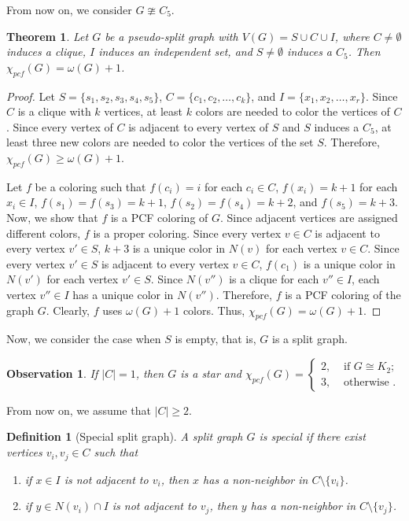 \documentclass[11pt]{article}
\theoremstyle{plain}
\newtheorem{theorem}{Theorem}
\newtheorem{defi}{Definition}
\newtheorem{obs}{Observation}
\begin{document}
From now on, we consider $G\ncong C_5$.

\begin{theorem}\label{Sneqemptyset}
	Let $G$ be a pseudo-split graph with $V(G) = S \cup C \cup I$, where $C\neq\emptyset$ induces a clique, $I$ induces an independent set, and $S\neq\emptyset$ induces a $C_5$. Then $\chi_{pcf}(G) = \omega(G)+1$.
\end{theorem}
\begin{proof}
	Let $S = \{s_1, s_2, s_3, s_4, s_5\}$, $C = \{c_1, c_2, \ldots, c_k\}$, and $I = \{x_1, x_2, \ldots, x_r\}$. Since $C$ is a clique with $k$ vertices, at least $k$ colors are needed to color the vertices of $C$. Since every vertex of $C$ is adjacent to every vertex of $S$ and $S$ induces a $C_5$, at least three new colors are needed to color the vertices of the set $S$. %
	Therefore, $\chi_{pcf}(G)\geq\omega(G)+1$.
	
	\medskip
	
	Let $f$ be a coloring such that $f(c_i) = i$ for each $c_i \in C$, $f(x_i) = k+1$ for each $x_i\in I$, $f(s_1) = f(s_3)=k+1$, $f(s_2) = f(s_4)=k+2$, and $f(s_5) = k+3$. 
	Now, we show that $f$ is a PCF coloring of $G$. Since adjacent vertices are assigned different colors, $f$ is a proper coloring. Since every vertex $v\in C$ is adjacent to every vertex $v'\in S$, $k+3$ is a unique color in $N(v)$ for each vertex $v\in C$. Since every vertex $v'\in S$ is adjacent to every vertex $v\in C$, $f(c_1)$ is a unique color in $N(v')$ for each vertex $v'\in S$. Since $N(v'')$ is a clique for each $v''\in I$, each vertex $v''\in I$ has a unique color in $N(v'')$. Therefore, $f$ is a PCF coloring of the graph $G$. Clearly, $f$ uses $\omega(G)+1$ colors.
	Thus, $\chi_{pcf}(G)=\omega(G)+1$.
\end{proof}

Now, we consider the case when $S$ is empty, that is, $G$ is a split graph. 

\begin{obs}
	If $|C|=1$, then $G$ is a star and $\chi_{pcf}(G) = \begin{cases} 
		2, & \text{ if } G\cong K_2; \\
		3, & \text{ otherwise }.
	\end{cases}$
\end{obs}

From now on, we assume that $|C|\geq 2$.
\begin{defi}[\textsf{Special split graph}]\label{special_split}
	A split graph $G$ is \emph{special} if there exist vertices $v_i, v_j \in C$ such that 
	\begin{enumerate}
		\item if $x\in I$ is not adjacent to $v_i$, then $x$ has a non-neighbor in $C\setminus\{v_i\}$.
		\item if $y\in N(v_i)\cap I$ is not adjacent to $v_j$, then $y$ has a non-neighbor in $C\setminus\{v_j\}$.
	\end{enumerate}
\end{defi}
\end{document}
